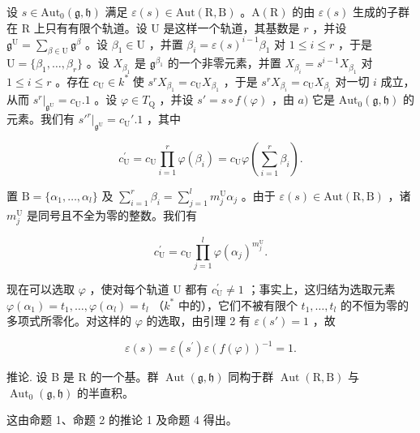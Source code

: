 设 \(s \in \mathrm{Aut}_0(\mathfrak{g}, \mathfrak{h})\) 满足 \(\varepsilon(s) \in \mathrm{Aut}(\mathrm{R}, \mathrm{B})\) 。\(\mathrm{A}(\mathrm{R})\) 的由 \(\varepsilon(s)\) 生成的子群在 \(\mathrm{R}\) 上只有有限个轨道。设 \(\mathrm{U}\) 是这样一个轨道，其基数是 \(r\) ，并设 \(\mathfrak{g}^{\mathrm{U}} = \sum_{\beta \in \mathrm{U}} \mathfrak{g}^{\beta}\) 。设 \(\beta_1 \in \mathrm{U}\) ，并置 \(\beta_i = \varepsilon(s)^{i-1}\beta_1\) 对 \(1 \leq i \leq r\) ，于是 \(\mathrm{U} = \{\beta_1, \ldots, \beta_r\}\) 。设 \(X_{\beta_1}\) 是 \(\mathfrak{g}^{\beta_1}\) 的一个非零元素，并置 \(X_{\beta_i} = s^{i-1}X_{\beta_1}\) 对 \(1 \leq i \leq r\) 。存在 \(c_{\mathrm{U}} \in k^*\) 使 \(s^r X_{\beta_1} = c_{\mathrm{U}}X_{\beta_1}\) ，于是 \(s^r X_{\beta_i} = c_{\mathrm{U}}X_{\beta_i}\) 对一切 \(i\) 成立，从而 \(s^r |_{\mathfrak{g}^{\mathrm{U}}} = c_{\mathrm{U}}.1\) 。设 \(\varphi \in T_{\mathrm{Q}}\) ，并设 \(s' = s \circ f(\varphi)\) ，由 \(a)\) 它是 \(\mathrm{Aut}_0(\mathfrak{g}, \mathfrak{h})\) 的元素。我们有 \(s'^r |_{\mathfrak{g}^{\mathrm{U}}} = c_{\mathrm{U}}'.1\) ，其中

\[
c _ {\mathrm{U}} ^ {\prime} = c _ {\mathrm{U}} \prod_ {i = 1} ^ {r} \varphi (\beta_ {i}) = c _ {\mathrm{U}} \varphi \left(\sum_ {i = 1} ^ {r} \beta_ {i}\right).
\]

置 \(\mathrm{B} = \{\alpha_1, \ldots, \alpha_l\}\) 及 \(\sum_{i=1}^{r} \beta_i = \sum_{j=1}^{l} m_j^{\mathrm{U}} \alpha_j\) 。由于 \(\varepsilon(s) \in \mathrm{Aut}(\mathrm{R}, \mathrm{B})\) ，诸 \(m_j^{\mathrm{U}}\) 是同号且不全为零的整数。我们有

\[
c _ {\mathrm{U}} ^ {\prime} = c _ {\mathrm{U}} \prod_ {j = 1} ^ {l} \varphi (\alpha_ {j}) ^ {m _ {j} ^ {\mathrm{U}}}.
\]

现在可以选取 \(\varphi\) ，使对每个轨道 U 都有 \(c_{\mathrm{U}}^{\prime} \neq 1\) ；事实上，这归结为选取元素 \(\varphi(\alpha_1) = t_1, \ldots, \varphi(\alpha_l) = t_l\) （\(k^*\) 中的），它们不被有限个 \(t_1, \ldots, t_l\) 的不恒为零的多项式所零化。对这样的 \(\varphi\) 的选取，由引理 2 有 \(\varepsilon(s') = 1\) ，故

\[
\varepsilon (s) = \varepsilon (s ^ {\prime}) \varepsilon (f (\varphi)) ^ {- 1} = 1.
\]

推论. 设 B 是 R 的一个基。群 \(\operatorname{Aut}(\mathfrak{g},\mathfrak{h})\) 同构于群 \(\operatorname{Aut}(\mathrm{R},\mathrm{B})\) 与 \(\operatorname{Aut}_{0}(\mathfrak{g},\mathfrak{h})\) 的半直积。

这由命题 1、命题 2 的推论 1 及命题 4 得出。

